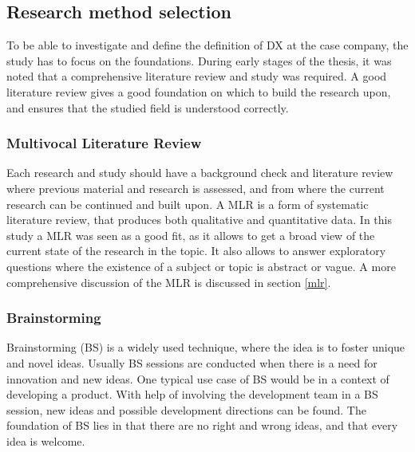\documentclass[english, 12pt, a4paper, sci, utf8, a-1b, online]{aaltothesis}
\begin{document}
\subsection{Research method selection}

To be able to investigate and define the definition of DX at the case company, the study has to focus on the foundations. During early stages of the thesis, it was noted that a comprehensive literature review and study was required. A good literature review gives a good foundation on which to build the research upon, and ensures that the studied field is understood correctly.

\subsubsection{Multivocal Literature Review}

Each research and study should have a background check and literature review where previous material and research is assessed, and from where the current research can be continued and built upon. A MLR is a form of systematic literature review, that produces both qualitative and quantitative data. In this study a MLR was seen as a good fit, as it allows to get a broad view of the current state of the research in the topic. It also allows to answer exploratory questions where the existence of a subject or topic is abstract or vague. A more comprehensive discussion of the MLR is discussed in section \ref{mlr}.


\subsubsection{Brainstorming}

Brainstorming (BS) is a widely used technique, where the idea is to foster unique and novel ideas. Usually BS sessions are conducted when there is a need for innovation and new ideas. One typical use case of BS would be in a context of developing a product. With help of involving the development team in a BS session, new ideas and possible development directions can be found. The foundation of BS lies in that there are no right and wrong ideas, and that every idea is welcome.
\end{document}
